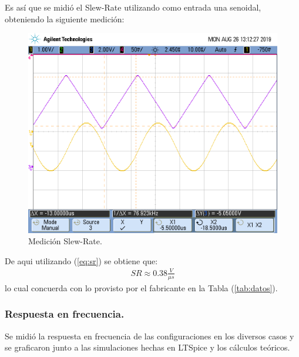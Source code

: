 Es así que se midió el Slew-Rate utilizando como entrada una senoidal, obteniendo la siguiente medición:
\begin{figure}[H]	
	\centering
	\includegraphics[width=\textwidth]{Ejercicio1/Imagenes/slew_rate1.png}
	\caption{Medición Slew-Rate.}
	\label{fig:SlewRate}
\end{figure}
De aqui utilizando (\ref{eq:sr}) se obtiene que:
\begin{align}
SR \approx  0.38 \frac{V}{\mu s}
\end{align}
lo cual concuerda con lo provisto por el fabricante en la Tabla (\ref{tab:datos}).
\subsubsection{Respuesta en frecuencia.}
Se midió la respuesta en frecuencia de las configuraciones en los diversos casos y se graficaron junto a las simulaciones hechas en LTSpice y los cálculos teóricos.

